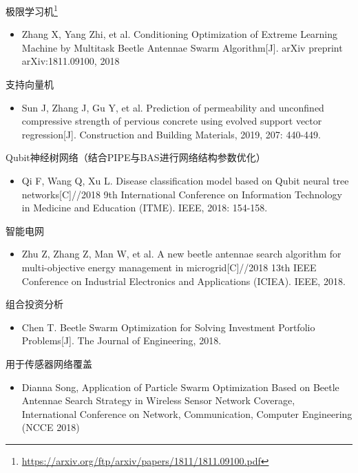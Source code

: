 \documentclass[]{ctexbook}
\providecommand{\tightlist}{%
  \setlength{\itemsep}{0pt}\setlength{\parskip}{0pt}}
\renewcommand{\href}[2]{#2\footnote{\url{#1}}}
\begin{document}
\href{https://arxiv.org/ftp/arxiv/papers/1811/1811.09100.pdf}{极限学习机}

\begin{itemize}
\tightlist
\item
  Zhang X, Yang Zhi, et al. Conditioning Optimization of Extreme
  Learning Machine by Multitask Beetle Antennae Swarm Algorithm{[}J{]}.
  arXiv preprint arXiv:1811.09100, 2018
\end{itemize}

支持向量机

\begin{itemize}
\tightlist
\item
  Sun J, Zhang J, Gu Y, et al. Prediction of permeability and unconfined
  compressive strength of pervious concrete using evolved support vector
  regression{[}J{]}. Construction and Building Materials, 2019, 207:
  440-449.
\end{itemize}

Qubit神经树网络（结合PIPE与BAS进行网络结构参数优化）

\begin{itemize}
\tightlist
\item
  Qi F, Wang Q, Xu L. Disease classification model based on Qubit neural
  tree networks{[}C{]}//2018 9th International Conference on Information
  Technology in Medicine and Education (ITME). IEEE, 2018: 154-158.
\end{itemize}

智能电网

\begin{itemize}
\tightlist
\item
  Zhu Z, Zhang Z, Man W, et al. A new beetle antennae search algorithm
  for multi-objective energy management in microgrid{[}C{]}//2018 13th
  IEEE Conference on Industrial Electronics and Applications (ICIEA).
  IEEE, 2018.
\end{itemize}

组合投资分析

\begin{itemize}
\tightlist
\item
  Chen T. Beetle Swarm Optimization for Solving Investment Portfolio
  Problems{[}J{]}. The Journal of Engineering, 2018.
\end{itemize}

用于传感器网络覆盖

\begin{itemize}
\tightlist
\item
  Dianna Song, Application of Particle Swarm Optimization Based on
  Beetle Antennae Search Strategy in Wireless Sensor Network Coverage,
  International Conference on Network, Communication, Computer
  Engineering (NCCE 2018)
\end{itemize}
\end{document}
